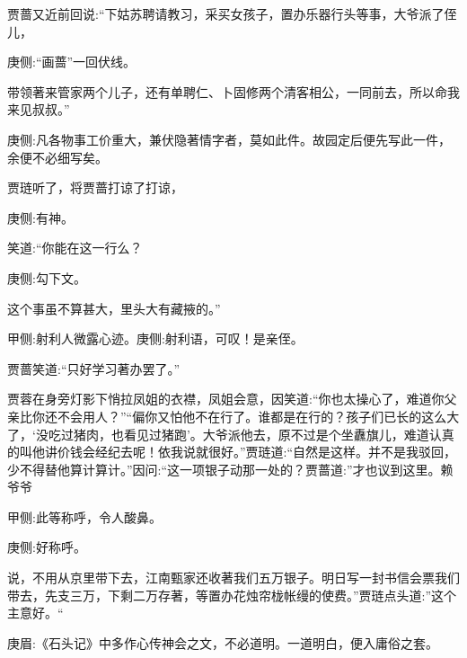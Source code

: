 \begin{parag}
    贾蔷又近前回说:“下姑苏聘请教习，采买女孩子，置办乐器行头等事，大爷派了侄儿，\begin{note}庚侧:“画蔷”一回伏线。\end{note}带领著来管家两个儿子，还有单聘仁、卜固修两个清客相公，一同前去，所以命我来见叔叔。”\begin{note}庚侧:凡各物事工价重大，兼伏隐著情字者，莫如此件。故园定后便先写此一件，余便不必细写矣。\end{note}贾琏听了，将贾蔷打谅了打谅，\begin{note}庚侧:有神。\end{note}笑道:“你能在这一行么？\begin{note}庚侧:勾下文。\end{note}这个事虽不算甚大，里头大有藏掖的。”\begin{note}甲侧:射利人微露心迹。庚侧:射利语，可叹！是亲侄。\end{note}贾蔷笑道:“只好学习著办罢了。”
\end{parag}


\begin{parag}
    贾蓉在身旁灯影下悄拉凤姐的衣襟，凤姐会意，因笑道:“你也太操心了，难道你父亲比你还不会用人？”“偏你又怕他不在行了。谁都是在行的？孩子们已长的这么大了，‘没吃过猪肉，也看见过猪跑’。大爷派他去，原不过是个坐纛旗儿，难道认真的叫他讲价钱会经纪去呢！依我说就很好。”贾琏道:“自然是这样。并不是我驳回，少不得替他算计算计。”因问:“这一项银子动那一处的？贾蔷道:”才也议到这里。赖爷爷\begin{note}甲侧:此等称呼，令人酸鼻。\end{note}\begin{note}庚侧:好称呼。\end{note}说，不用从京里带下去，江南甄家还收著我们五万银子。明日写一封书信会票我们带去，先支三万，下剩二万存著，等置办花烛帘栊帐缦的使费。”贾琏点头道:”这个主意好。“\begin{note}庚眉:《石头记》中多作心传神会之文，不必道明。一道明白，便入庸俗之套。\end{note}
\end{parag}



